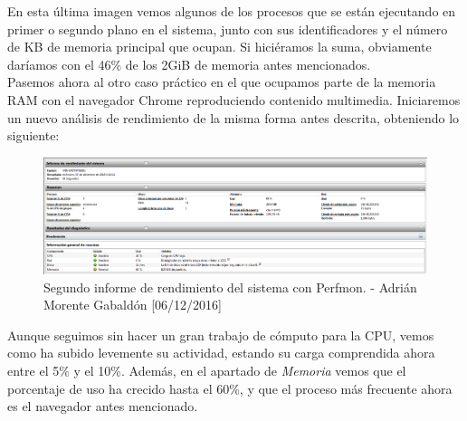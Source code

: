 En esta última imagen vemos algunos de los procesos que se están ejecutando en primer o segundo plano en el sistema, junto con sus identificadores y el número de KB de memoria principal que ocupan. Si hiciéramos la suma, obviamente daríamos con el 46\% de los 2GiB de memoria antes mencionados. \\
Pasemos ahora al otro caso práctico en el que ocupamos parte de la memoria RAM con el navegador Chrome reproduciendo contenido multimedia. Iniciaremos un nuevo análisis de rendimiento de la misma forma antes descrita, obteniendo lo siguiente:
\begin{figure}[H]
	\centering
	\includegraphics[scale=0.35]{perfmon-3}
	\caption{Segundo informe de rendimiento del sistema con Perfmon. - Adrián Morente Gabaldón [06/12/2016]}
	\label{figura11}
\end{figure}
Aunque seguimos sin hacer un gran trabajo de cómputo para la CPU, vemos como ha subido levemente su actividad, estando su carga comprendida ahora entre el 5\% y el 10\%. Además, en el apartado de \emph{Memoria} vemos que el porcentaje de uso ha crecido hasta el 60\%, y que el proceso más frecuente ahora es el navegador antes mencionado.

